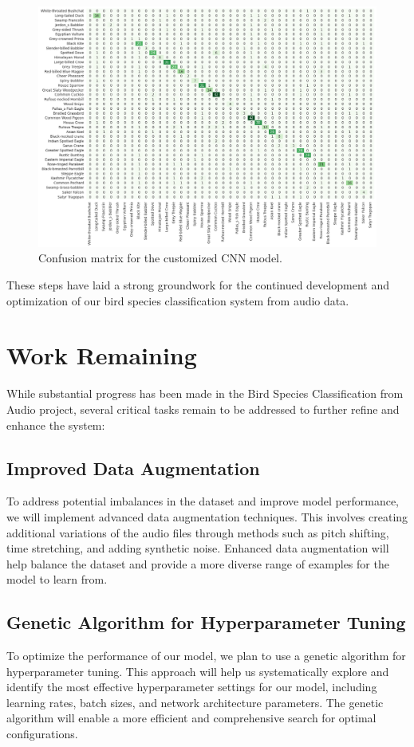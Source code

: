 \begin{figure}[h!]
    \centering
    \includegraphics[scale=0.3]{images/confusion_matrix.png}
    \caption{Confusion matrix for the customized CNN model.}
    \label{fig:Confusion matrix}
\end{figure}
\newpage
These steps have laid a strong groundwork for the continued development and optimization of our bird species classification system from audio data.

\newpage

\section{Work Remaining}
While substantial progress has been made in the Bird Species Classification from Audio project, several critical tasks remain to be addressed to further refine and enhance the system:

\subsection{Improved Data Augmentation}
To address potential imbalances in the dataset and improve model performance, we will implement advanced data augmentation techniques. This involves creating additional variations of the audio files through methods such as pitch shifting, time stretching, and adding synthetic noise. Enhanced data augmentation will help balance the dataset and provide a more diverse range of examples for the model to learn from.

\subsection{Genetic Algorithm for Hyperparameter Tuning}
To optimize the performance of our model, we plan to use a genetic algorithm for hyperparameter tuning. This approach will help us systematically explore and identify the most effective hyperparameter settings for our model, including learning rates, batch sizes, and network architecture parameters. The genetic algorithm will enable a more efficient and comprehensive search for optimal configurations.

